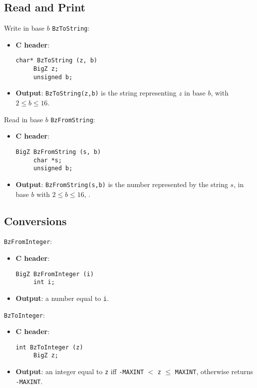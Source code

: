 \subsection{Read and Print}
 
\begin{func} Write in base $b$  \verb+BzToString+:
\begin{itemize}
  \item{\bf C header}:
\begin{verbatim}
char* BzToString (z, b)
     BigZ z;
     unsigned b;
\end{verbatim}
  \item{\bf Output}: \verb+BzToString(z,b)+ is the string representing
$z$ in base $b$, with $2 \leq b \leq 16$.
\end{itemize}
\end{func}

 
\begin{func} Read in base $b$  \verb+BzFromString+:
\begin{itemize}
  \item{\bf C header}:
\begin{verbatim}
BigZ BzFromString (s, b)
     char *s;
     unsigned b;
\end{verbatim}
  \item{\bf Output}: \verb+BzFromString(s,b)+ is the number represented
by the string $s$, in base $b$ with $2 \leq b \leq 16$, .
\end{itemize}
\end{func}

\subsection{Conversions}

\begin{func}  \verb+BzFromInteger+:
\begin{itemize}
  \item{\bf C header}:
\begin{verbatim}
BigZ BzFromInteger (i)    
     int i;
\end{verbatim}
  \item{\bf Output}: a number equal to \verb/i/.
\end{itemize}
\end{func}


\begin{func}  \verb+BzToInteger+:
\begin{itemize}
  \item{\bf C header}:
\begin{verbatim}
int BzToInteger (z)    
     BigZ z;
\end{verbatim}
  \item{\bf Output}: an integer equal to \verb/z/ 
   iff \verb/-MAXINT/ $<$ \verb/z/ $\leq$ \verb/MAXINT/,
                    otherwise returns \verb/-MAXINT/.
\end{itemize}
\end{func}


